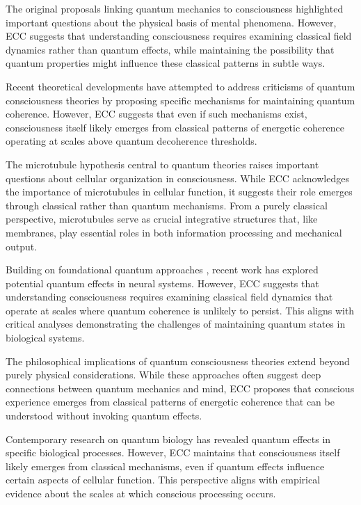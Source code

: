 The original proposals linking quantum mechanics to consciousness \cite{Beck1992} highlighted important questions about the physical basis of mental phenomena. However, ECC suggests that understanding consciousness requires examining classical field dynamics rather than quantum effects, while maintaining the possibility that quantum properties might influence these classical patterns in subtle ways.

Recent theoretical developments \cite{Hameroff2014} have attempted to address criticisms of quantum consciousness theories by proposing specific mechanisms for maintaining quantum coherence. However, ECC suggests that even if such mechanisms exist, consciousness itself likely emerges from classical patterns of energetic coherence operating at scales above quantum decoherence thresholds.

The microtubule hypothesis central to quantum theories \cite{Hameroff2014} raises important questions about cellular organization in consciousness. While ECC acknowledges the importance of microtubules in cellular function, it suggests their role emerges through classical rather than quantum mechanisms. From a purely classical perspective, microtubules serve as crucial integrative structures that, like membranes, play essential roles in both information processing and mechanical output.

Building on foundational quantum approaches \cite{Penrose1989}, recent work has explored potential quantum effects in neural systems. However, ECC suggests that understanding consciousness requires examining classical field dynamics that operate at scales where quantum coherence is unlikely to persist. This aligns with critical analyses \cite{Tegmark2000} demonstrating the challenges of maintaining quantum states in biological systems.

The philosophical implications of quantum consciousness theories \cite{Bohm1990} extend beyond purely physical considerations. While these approaches often suggest deep connections between quantum mechanics and mind, ECC proposes that conscious experience emerges from classical patterns of energetic coherence that can be understood without invoking quantum effects.

Contemporary research on quantum biology \cite{Koch2006} has revealed quantum effects in specific biological processes. However, ECC maintains that consciousness itself likely emerges from classical mechanisms, even if quantum effects influence certain aspects of cellular function. This perspective aligns with empirical evidence about the scales at which conscious processing occurs.

